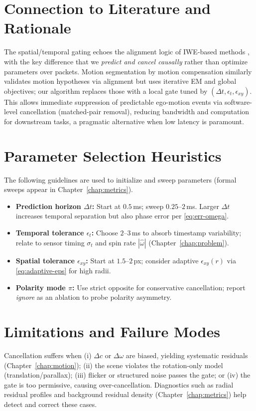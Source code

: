 \section{Connection to Literature and Rationale}
The spatial/temporal gating echoes the alignment logic of IWE-based methods \cite{Gallego2018CMax}, with the key difference that we \emph{predict and cancel causally} rather than optimize parameters over packets. Motion segmentation by motion compensation \cite{Stoffregen2019Segmentation} similarly validates motion hypotheses via alignment but uses iterative EM and global objectives; our algorithm replaces those with a local gate tuned by $(\Delta t,\epsilon_t,\epsilon_{xy})$. This allows immediate suppression of predictable ego-motion events via software-level cancellation (matched-pair removal), reducing bandwidth and computation for downstream tasks, a pragmatic alternative when low latency is paramount.

\section{Parameter Selection Heuristics}
The following guidelines are used to initialize and sweep parameters (formal sweeps appear in Chapter~\ref{chap:metrics}).
\begin{itemize}
    \item \textbf{Prediction horizon $\Delta t$:} Start at $0.5$\,ms; sweep $0.25$–$2$\,ms. Larger $\Delta t$ increases temporal separation but also phase error per \eqref{eq:err-omega}.
    \item \textbf{Temporal tolerance $\epsilon_t$:} Choose $2$–$3$\,ms to absorb timestamp variability; relate to sensor timing $\sigma_t$ and spin rate $|\hat\omega|$ (Chapter~\ref{chap:problem}).
    \item \textbf{Spatial tolerance $\epsilon_{xy}$:} Start at $1.5$–$2$\,px; consider adaptive $\epsilon_{xy}(r)$ via \eqref{eq:adaptive-eps} for high radii.
    \item \textbf{Polarity mode $\pi$:} Use strict opposite for conservative cancellation; report \emph{ignore} as an ablation to probe polarity asymmetry.
\end{itemize}

\section{Limitations and Failure Modes}
Cancellation suffers when (i) $\Delta c$ or $\Delta\omega$ are biased, yielding systematic residuals (Chapter~\ref{chap:motion}); (ii) the scene violates the rotation-only model (translation/parallax); (iii) flicker or structured noise passes the gate; or (iv) the gate is too permissive, causing over-cancellation. Diagnostics such as radial residual profiles and background residual density (Chapter~\ref{chap:metrics}) help detect and correct these cases.

